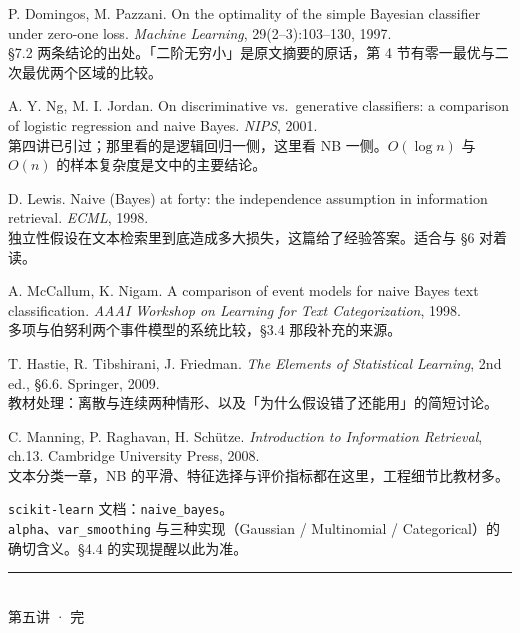 \documentclass[11pt,a4paper,fontset=windows,zihao=-4]{ctexart}
\begin{document}
\begin{enumerate}[label={[\arabic*]},leftmargin=2.6em,itemsep=0.7em]
  \item P. Domingos, M. Pazzani. On the optimality of the simple Bayesian classifier under zero-one loss. \emph{Machine Learning}, 29(2--3):103--130, 1997.\\[1pt]
  {\footnotesize\color{steel}§7.2 两条结论的出处。「二阶无穷小」是原文摘要的原话，第 4 节有零一最优与二次最优两个区域的比较。}

  \item A. Y. Ng, M. I. Jordan. On discriminative vs.\ generative classifiers: a comparison of logistic regression and naive Bayes. \emph{NIPS}, 2001.\\[1pt]
  {\footnotesize\color{steel}第四讲已引过；那里看的是逻辑回归一侧，这里看 NB 一侧。$O(\log n)$ 与 $O(n)$ 的样本复杂度是文中的主要结论。}

  \item D. Lewis. Naive (Bayes) at forty: the independence assumption in information retrieval. \emph{ECML}, 1998.\\[1pt]
  {\footnotesize\color{steel}独立性假设在文本检索里到底造成多大损失，这篇给了经验答案。适合与 §6 对着读。}

  \item A. McCallum, K. Nigam. A comparison of event models for naive Bayes text classification. \emph{AAAI Workshop on Learning for Text Categorization}, 1998.\\[1pt]
  {\footnotesize\color{steel}多项与伯努利两个事件模型的系统比较，§3.4 那段补充的来源。}

  \item T. Hastie, R. Tibshirani, J. Friedman. \emph{The Elements of Statistical Learning}, 2nd ed., §6.6. Springer, 2009.\\[1pt]
  {\footnotesize\color{steel}教材处理：离散与连续两种情形、以及「为什么假设错了还能用」的简短讨论。}

  \item C. Manning, P. Raghavan, H. Schütze. \emph{Introduction to Information Retrieval}, ch.13. Cambridge University Press, 2008.\\[1pt]
  {\footnotesize\color{steel}文本分类一章，NB 的平滑、特征选择与评价指标都在这里，工程细节比教材多。}

  \item \texttt{scikit-learn} 文档：\texttt{naive\_bayes}。\\[1pt]
  {\footnotesize\color{steel}\texttt{alpha}、\texttt{var\_smoothing} 与三种实现（Gaussian / Multinomial / Categorical）的确切含义。§4.4 的实现提醒以此为准。}
\end{enumerate}

\vspace{1.0em}
\begin{flushright}
{\color{navy!25}\rule{3.2cm}{0.5pt}}\\[5pt]
{\footnotesize\color{steel}第五讲 · 完}
\end{flushright}
\end{document}
